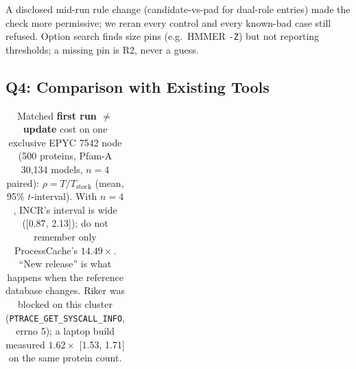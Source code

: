 \documentclass[letterpaper,twocolumn,10pt]{article}
\theoremstyle{definition}
\begin{document}
A disclosed mid\nobreakdash-run rule change (candidate\nobreakdash-vs\nobreakdash-pad for dual\nobreakdash-role entries) made the check more permissive; we reran every control and every known\nobreakdash-bad case still refused. Option search finds size pins (e.g.\ HMMER \texttt{-Z}) but not reporting thresholds; a missing pin is R2, never a guess.

\subsection{Q4: Comparison with Existing Tools}
\label{sec:eval-baselines}

\begin{table}[t]
\caption{Matched \textbf{first run $\neq$ update} cost on one exclusive EPYC 7542 node (500 proteins, Pfam\nobreakdash-A 30{,}134 models,
$n{=}4$ paired): $\rho = T/T_{\mathrm{stock}}$ (mean, 95\% $t$-interval). With $n{=}4$, INCR's interval is wide
([0.87, 2.13]); do not remember only ProcessCache's $14.49\times$. ``New release'' is what happens when the
reference database changes. Riker was blocked on this cluster (\texttt{PTRACE\_GET\_SYSCALL\_INFO}, errno 5); a laptop
build measured $1.62\times$ [1.53, 1.71] on the same protein count.}
\label{tab:baselines}
\centering\small
\setlength{\tabcolsep}{4.5pt}
\begin{tabular}{@{}lcc@{}}

\end{tabular}
\end{table}
\end{document}
